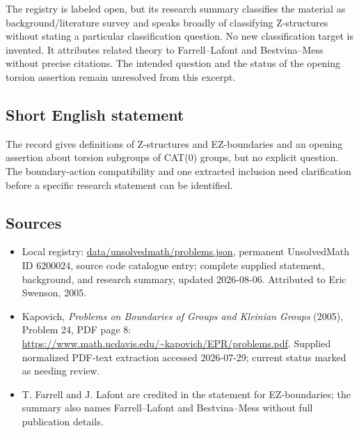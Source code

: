\documentclass[11pt]{article}
\begin{document}
The registry is labeled open, but its research summary classifies the material as background/literature survey and speaks broadly of classifying Z-structures without stating a particular classification question. No new classification target is invented. It attributes related theory to Farrell--Lafont and Bestvina--Mess without precise citations. The intended question and the status of the opening torsion assertion remain unresolved from this excerpt.
\subsection{Short English statement}
The record gives definitions of Z-structures and EZ-boundaries and an opening assertion about torsion subgroups of CAT(0) groups, but no explicit question. The boundary-action compatibility and one extracted inclusion need clarification before a specific research statement can be identified.
\subsection{Sources}
\begin{itemize}
\item Local registry: \url{data/unsolvedmath/problems.json}, permanent UnsolvedMath ID \(6200024\), source code catalogue entry; complete supplied statement, background, and research summary, updated 2026-08-06. Attributed to Eric Swenson, 2005.
\item Kapovich, \emph{Problems on Boundaries of Groups and Kleinian Groups} (2005), Problem 24, PDF page 8: \url{https://www.math.ucdavis.edu/~kapovich/EPR/problems.pdf}. Supplied normalized PDF-text extraction accessed 2026-07-29; current status marked as needing review.
\item T. Farrell and J. Lafont are credited in the statement for EZ-boundaries; the summary also names Farrell--Lafont and Bestvina--Mess without full publication details.
\end{itemize}
\end{document}
